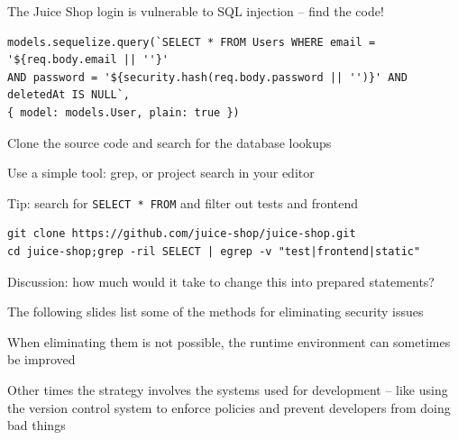 \documentclass[Screen16to9,17pt]{foils}
\begin{document}

The Juice Shop login is vulnerable to SQL injection -- find the code!

\begin{verbatim}
models.sequelize.query(`SELECT * FROM Users WHERE email = '${req.body.email || ''}'
AND password = '${security.hash(req.body.password || '')}' AND deletedAt IS NULL`,
{ model: models.User, plain: true })
\end{verbatim}


\begin{list2}
\item Clone the source code and search for the database lookups
\item Use a simple tool: grep, or project search in your editor
\item Tip: search for \verb+SELECT * FROM+ and filter out tests and frontend
\end{list2}

\begin{verbatim}
git clone https://github.com/juice-shop/juice-shop.git
cd juice-shop;grep -ril SELECT | egrep -v "test|frontend|static"
\end{verbatim}

Discussion: how much would it take to change this into prepared statements?


\breakdance




\begin{list2}
\item The following slides list some of the methods for eliminating security issues
\item When eliminating them is not possible, the runtime environment can sometimes be improved
\item Other times the strategy involves the systems used for development -- like using the version control system to enforce policies and prevent developers from doing bad things
\end{list2}
\end{document}
